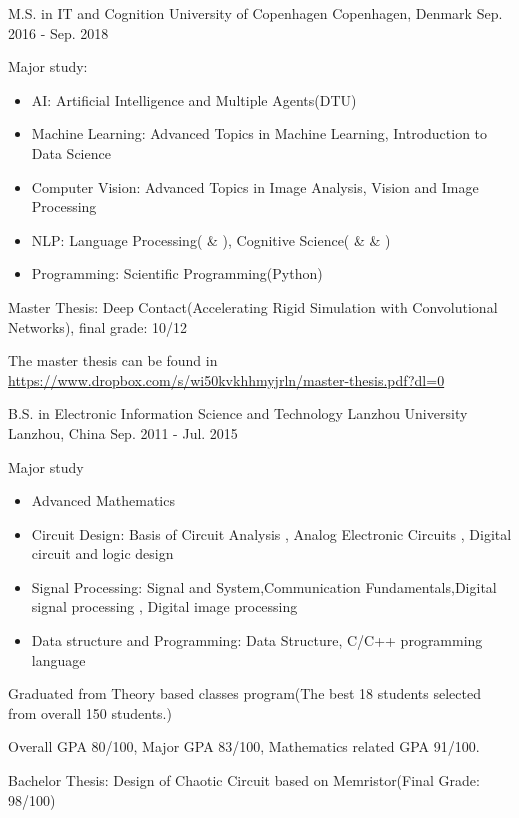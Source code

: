 \begin{cventries}
  \cventry
    {M.S. in IT and Cognition}
    {University of Copenhagen}
    {Copenhagen, Denmark}
    {Sep. 2016 - Sep. 2018}
    {
      \begin{cvitems}
        \item {
            Major study:
            \begin{itemize}
                \item AI: Artificial Intelligence and Multiple Agents(DTU)
                \item Machine Learning: Advanced Topics in Machine Learning,  Introduction to Data Science
                \item Computer Vision: Advanced Topics in Image Analysis, Vision and Image Processing
                \item NLP: Language Processing(\uppercase\expandafter{} \& \uppercase\expandafter{}), Cognitive Science(\uppercase\expandafter{} \& \uppercase\expandafter{} \& \uppercase\expandafter{})
                \item Programming: Scientific Programming(Python)
            \end{itemize}
        }
        \item {Master Thesis: Deep Contact(Accelerating Rigid Simulation with Convolutional Networks), final grade: 10/12}
        \item {The master thesis can be found in \url{https://www.dropbox.com/s/wi50kvkhhmyjrln/master-thesis.pdf?dl=0}}
      \end{cvitems}
    }
    \cventry
    {B.S. in Electronic Information Science and Technology}
    {Lanzhou University}
    {Lanzhou, China}
    {Sep. 2011 - Jul. 2015}
    {
      \begin{cvitems}
        \item {
            Major study
            \begin{itemize}
                \item Advanced Mathematics
                \item Circuit Design: Basis of Circuit Analysis , Analog Electronic Circuits , Digital
                circuit and logic design
                \item Signal Processing: Signal and System,Communication Fundamentals,Digital
                signal processing , Digital image processing
                \item Data structure and Programming: Data Structure, C/C++ programming language
            \end{itemize}
        }
        \item {Graduated from Theory based classes program(The best 18 students selected from overall 150 students.)}
        \item {Overall GPA 80/100, Major GPA 83/100, Mathematics related GPA 91/100.}
	\item {Bachelor Thesis: Design of Chaotic Circuit based on Memristor(Final Grade: 98/100)}
      \end{cvitems}
    }
\end{cventries}
